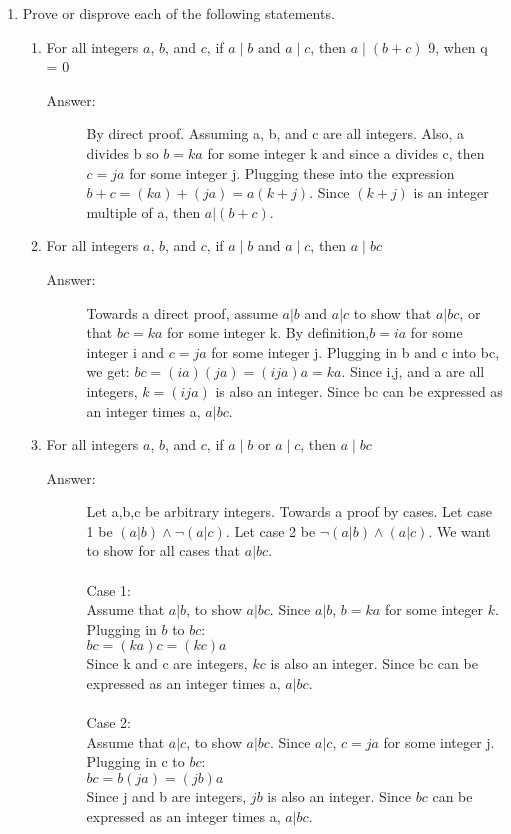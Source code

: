 \documentclass[12pt, oneside]{article}
\begin{document}
\begin{enumerate}
\item Prove or disprove each of the following statements.
\begin{enumerate}
    \item For all integers $a$, $b$, and $c$, if $a \mid b$ and $a \mid c$, then $a \mid (b + c)$
    9, when q = 0
    \begin{description}
      \item[Answer:] By direct proof. Assuming a, b, and c are all integers. Also, a divides b so $b = ka$ for some integer k and since a divides c, then $c = ja$ for some integer j. Plugging these into the expression  $b + c = (ka) + (ja) = a(k+j)$. Since $(k+j)$ is an integer multiple of a, then $a|(b+c)$.
    \end{description}
    \item For all integers $a$, $b$, and $c$, if $a \mid b$ and $a \mid c$, then $a \mid bc$
    \begin{description}
      \item[Answer:] Towards a direct proof, assume $a | b$ and $a | c$ to show that $a | bc$, or that $bc = ka$ for some integer k. By definition,$b = ia$ for some integer i and $c = ja$ for some integer j. Plugging in b and c into bc, we get: $bc = (ia)(ja) = (ija)a = ka$. Since i,j, and a are all integers, $k = (ija)$ is also an integer. Since bc can be expressed as an integer times a, $a | bc$.      
    \end{description}
    \item For all integers $a$, $b$, and $c$, if $a \mid b$ or $a \mid c$, then $a \mid bc$
    \begin{description}
      \item[Answer:] Let a,b,c be arbitrary integers. Towards a proof by cases. Let case 1 be $(a | b) \land \lnot (a | c)$. Let case 2 be $\lnot (a | b) \land (a | c)$. We want to show for all cases that $a | bc$.\\\\
      Case 1:\\
      Assume that $a|b$, to show $a|bc$. Since $a|b$, $b = ka$ for some integer $k$. Plugging in $b$ to $bc$:\\ $bc = (ka)c = (kc)a$\\
      Since k and c are integers, $kc$ is also an integer. Since bc can be expressed as an integer times a, $a|bc$.\\\\
      Case 2:\\
      Assume that $a|c$, to show $a|bc$. Since $a|c$, $c = ja$ for some integer j. Plugging in c to $bc$:\\$bc = b(ja) = (jb)a$\\
      Since j and b are integers, $jb$ is also an integer. Since $bc$ can be expressed as an integer times a, $a|bc$.
    \end{description}
  \end{enumerate}





\end{enumerate}
\end{document}
